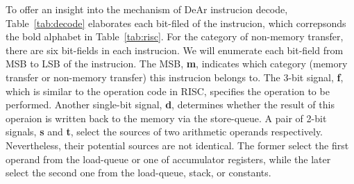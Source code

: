     To offer an insight into the mechanism of DeAr instrucion decode, 
    Table~\ref{tab:decode} elaborates each bit-filed of the instrucion, 
    which correpsonds the bold alphabet in Table~\ref{tab:risc}.
    For the category of non-memory transfer, there are six bit-fields in each instrucion.
    We will enumerate each bit-field from MSB to LSB of the instrucion.
    The MSB, \textbf{m}, indicates which category (memory transfer or non-memory transfer) this instrucion belongs to.
    The 3-bit signal, \textbf{f}, which is similar to the operation code in RISC, specifies the operation to be performed.
    Another single-bit signal, \textbf{d}, determines whether the result of this operaion is written back to the memory via the store-queue.
    A pair of 2-bit signals, \textbf{s} and \textbf{t}, select the sources of two arithmetic operands respectively. 
    Nevertheless, their potential sources are not identical.
    The former select the first operand from the load-queue or one of accumulator registers, 
    while the later select the second one from the load-queue, stack, or constants.
